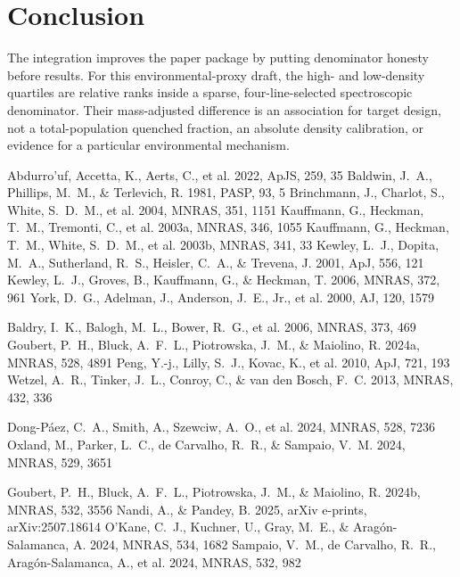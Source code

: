 \documentclass[twocolumn]{aastex631}
\begin{document}
\section{Conclusion}\label{sec:conclusion}
The integration improves the paper package by putting denominator honesty before results. For this environmental-proxy draft, the high- and low-density quartiles are relative ranks inside a sparse, four-line-selected spectroscopic denominator. Their mass-adjusted difference is an association for target design, not a total-population quenched fraction, an absolute density calibration, or evidence for a particular environmental mechanism.


\begin{thebibliography}{}
 Abdurro'uf, Accetta, K., Aerts, C., et al. 2022, ApJS, 259, 35
 Baldwin, J.~A., Phillips, M.~M., \& Terlevich, R. 1981, PASP, 93, 5
 Brinchmann, J., Charlot, S., White, S.~D.~M., et al. 2004, MNRAS, 351, 1151
 Kauffmann, G., Heckman, T.~M., Tremonti, C., et al. 2003a, MNRAS, 346, 1055
 Kauffmann, G., Heckman, T.~M., White, S.~D.~M., et al. 2003b, MNRAS, 341, 33
 Kewley, L.~J., Dopita, M.~A., Sutherland, R.~S., Heisler, C.~A., \& Trevena, J. 2001, ApJ, 556, 121
 Kewley, L.~J., Groves, B., Kauffmann, G., \& Heckman, T. 2006, MNRAS, 372, 961
 York, D.~G., Adelman, J., Anderson, J.~E., Jr., et al. 2000, AJ, 120, 1579

 Baldry, I.~K., Balogh, M.~L., Bower, R.~G., et al. 2006, MNRAS, 373, 469
 Goubert, P.~H., Bluck, A.~F.~L., Piotrowska, J.~M., \& Maiolino, R. 2024a, MNRAS, 528, 4891
 Peng, Y.-j., Lilly, S.~J., Kovac, K., et al. 2010, ApJ, 721, 193
 Wetzel, A.~R., Tinker, J.~L., Conroy, C., \& van den Bosch, F.~C. 2013, MNRAS, 432, 336

 Dong-Páez, C.~A., Smith, A., Szewciw, A.~O., et al. 2024, MNRAS, 528, 7236
 Oxland, M., Parker, L.~C., de Carvalho, R.~R., \& Sampaio, V.~M. 2024, MNRAS, 529, 3651

 Goubert, P.~H., Bluck, A.~F.~L., Piotrowska, J.~M., \& Maiolino, R. 2024b, MNRAS, 532, 3556
 Nandi, A., \& Pandey, B. 2025, arXiv e-prints, arXiv:2507.18614
 O'Kane, C.~J., Kuchner, U., Gray, M.~E., \& Aragón-Salamanca, A. 2024, MNRAS, 534, 1682
 Sampaio, V.~M., de Carvalho, R.~R., Aragón-Salamanca, A., et al. 2024, MNRAS, 532, 982
\end{thebibliography}
\end{document}
